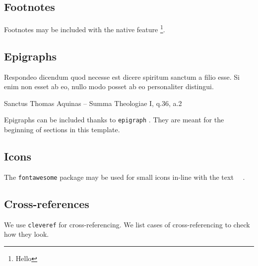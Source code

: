 \subsection{Footnotes}
Footnotes may be included with the native feature \footnote{Hello}.

\subsection{Epigraphs}
\epigraph{Respondeo dicendum quod necesse est dicere spiritum sanctum a filio
esse. Si enim non esset ab eo, nullo modo posset ab eo personaliter distingui.}
{Sanctus Thomas Aquinas -- Summa Theologiae I, q.36, a.2}

Epigraphs can be included thanks to \lstinline{epigraph} \cite{epigraph}.
They are meant for the beginning of sections in this template.

\subsection{Icons}
The \lstinline{fontawesome} package \cite{fontawesome-latex} may be used for
small icons in-line with the text \faSmileO~\faMedkit~\faBicycle.

\subsection{Cross-references}
We use \lstinline{cleveref} \cite{cleveref} for cross-referencing.  We list
cases of cross-referencing to check how they look.

